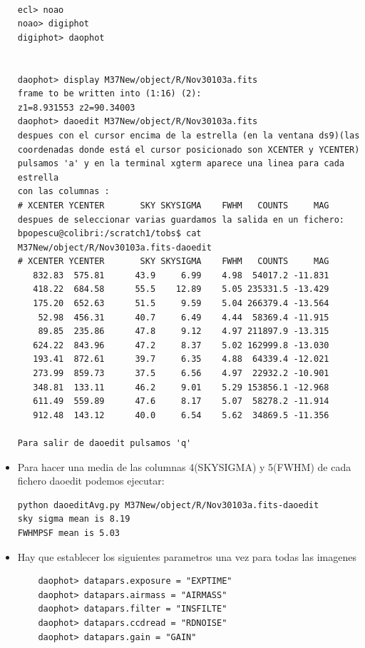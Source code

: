 \documentclass{article}
\begin{document}
\begin{itemize}
\begin{verbatim}

ecl> noao
noao> digiphot
digiphot> daophot


daophot> display M37New/object/R/Nov30103a.fits
frame to be written into (1:16) (2): 
z1=8.931553 z2=90.34003
daophot> daoedit M37New/object/R/Nov30103a.fits
despues con el cursor encima de la estrella (en la ventana ds9)(las coordenadas donde está el cursor posicionado son XCENTER y YCENTER) pulsamos 'a' y en la terminal xgterm aparece una linea para cada estrella
con las columnas :
# XCENTER YCENTER       SKY SKYSIGMA    FWHM   COUNTS     MAG
despues de seleccionar varias guardamos la salida en un fichero:
bpopescu@colibri:/scratch1/tobs$ cat M37New/object/R/Nov30103a.fits-daoedit 
# XCENTER YCENTER       SKY SKYSIGMA    FWHM   COUNTS     MAG
   832.83  575.81      43.9     6.99    4.98  54017.2 -11.831
   418.22  684.58      55.5    12.89    5.05 235331.5 -13.429
   175.20  652.63      51.5     9.59    5.04 266379.4 -13.564
    52.98  456.31      40.7     6.49    4.44  58369.4 -11.915
    89.85  235.86      47.8     9.12    4.97 211897.9 -13.315
   624.22  843.96      47.2     8.37    5.02 162999.8 -13.030
   193.41  872.61      39.7     6.35    4.88  64339.4 -12.021
   273.99  859.73      37.5     6.56    4.97  22932.2 -10.901
   348.81  133.11      46.2     9.01    5.29 153856.1 -12.968
   611.49  559.89      47.6     8.17    5.07  58278.2 -11.914
   912.48  143.12      40.0     6.54    5.62  34869.5 -11.356

Para salir de daoedit pulsamos 'q'

\end{verbatim}

\item 
Para hacer una media de las columnas 4(SKYSIGMA) y 5(FWHM) de cada fichero daoedit podemos ejecutar:

\begin{verbatim}
python daoeditAvg.py M37New/object/R/Nov30103a.fits-daoedit
sky sigma mean is 8.19
FWHMPSF mean is 5.03

\end{verbatim}

\item 
Hay que establecer los siguientes parametros una vez para todas las imagenes 

\begin{verbatim}
	daophot> datapars.exposure = "EXPTIME"
	daophot> datapars.airmass = "AIRMASS"
	daophot> datapars.filter = "INSFILTE"
	daophot> datapars.ccdread = "RDNOISE"
	daophot> datapars.gain = "GAIN"
\end{verbatim}



\end{itemize}
\end{document}
